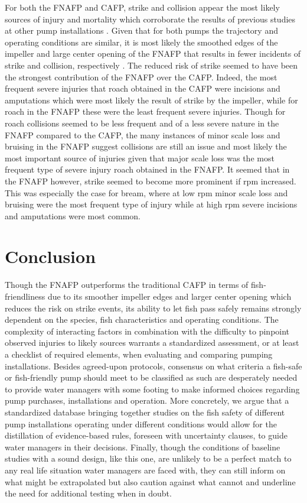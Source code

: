 \documentclass[fleqn,10pt]{wlscirep}
\begin{document}
For both the FNAFP and CAFP, strike and collision appear the most likely sources of injury and mortality which corroborate the results of previous studies at other pump installations \cite{Amaral2020ImprovingEdges,VanEsch2012FishStations,vanEsch2014ValidationStations}. Given that for both pumps the trajectory and operating conditions are similar, it is most likely the smoothed edges of the impeller and large center opening of the FNAFP that results in fewer incidents of strike and collision, respectively \cite{Amaral2020ImprovingEdges}. The reduced risk of strike seemed to have been the strongest contribution of the FNAFP over the CAFP. Indeed, the most frequent severe injuries that roach obtained in the CAFP were incisions and amputations which were most likely the result of strike by the impeller, while for roach in the FNAFP these were the least frequent severe injuries. Though for roach collisions seemed to be less frequent and of a less severe nature in the FNAFP compared to the CAFP, the many instances of minor scale loss and bruising in the FNAFP suggest collisions are still an issue and most likely the most important source of injuries given that major scale loss was the most frequent type of severe injury roach obtained in the FNAFP. It seemed that in the FNAFP however, strike seemed to become more prominent if rpm increased. This was especially the case for bream, where at low rpm minor scale loss and bruising were the most frequent type of injury while at high rpm severe incisions and amputations were most common. 

\section*{Conclusion}
Though the FNAFP outperforms the traditional CAFP in terms of fish-friendliness due to its smoother impeller edges and larger center opening which reduces the risk on strike events, its ability to let fish pass safely remains strongly dependent on the species, fish characteristics and operating conditions. The complexity of interacting factors in combination with the difficulty to pinpoint observed injuries to likely sources warrants a standardized assessment, or at least a checklist of required elements, when evaluating and comparing pumping installations. Besides agreed-upon protocols, consensus on what criteria a fish-safe or fish-friendly pump should meet to be classified as such are desperately needed to provide water managers with some footing to make informed choices regarding pump purchases, installations and operation. More concretely, we argue that a standardized database bringing together studies on the fish safety of different pump installations operating under different conditions would allow for the distillation of evidence-based rules, foreseen with uncertainty clauses, to guide water managers in their decisions. Finally, though the conditions of baseline studies with a sound design, like this one, are unlikely to be a perfect match to any real life situation water managers are faced with, they can still inform on what might be extrapolated but also caution against what cannot and underline the need for additional testing when in doubt. 
\end{document}
